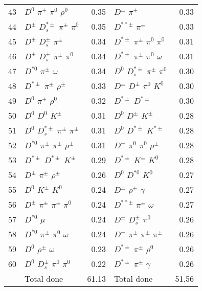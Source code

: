 \documentclass[6pt]{article}
\begin{document}
\begin{tabular}{rlr|lr}
43 & $D^0$ $\pi^{\pm}$ $\pi^0$ $\rho^0$ & 0.35 & $D^{\pm}$ $\pi^{\pm}$ & 0.33 \\
44 & $D^{\pm}$ $D_s^{*\pm}$ $\pi^{\pm}$ $\pi^0$ & 0.35 & $D^{**\pm}$ $\pi^{\pm}$ & 0.33 \\
45 & $D^{\pm}$ $D_s^{\pm}$ $\pi^{\pm}$ & 0.34 & $D^{*\pm}$ $\pi^{\pm}$ $\pi^0$ $\pi^0$ & 0.31 \\
46 & $D^{\pm}$ $D_s^{\pm}$ $\pi^{\pm}$ $\pi^0$ & 0.34 & $D^{*\pm}$ $\pi^{\pm}$ $\pi^0$ $\omega$ & 0.31 \\
47 & $D^{*0}$ $\pi^{\pm}$ $\omega$ & 0.34 & $D^0$ $D_s^{*\pm}$ $\pi^{\pm}$ $\pi^0$ & 0.30 \\
48 & $D^{*\pm}$ $\pi^{\pm}$ $\rho^{\pm}$ & 0.33 & $D^{\pm}$ $D^{\pm}$ $\pi^0$ $K^0$ & 0.30 \\
49 & $D^0$ $\pi^{\pm}$ $\rho^0$ & 0.32 & $D^{*\pm}$ $D^{*\pm}$ & 0.30 \\
50 & $D^0$ $D^0$ $K^{\pm}$ & 0.31 & $D^0$ $D^{\pm}$ $K^{\pm}$ & 0.28 \\
51 & $D^0$ $D_s^{*\pm}$ $\pi^{\pm}$ $\pi^{\pm}$ & 0.31 & $D^0$ $D^{*\pm}$ $K^{*\pm}$ & 0.28 \\
52 & $D^{*0}$ $\pi^{\pm}$ $\pi^{\pm}$ $\rho^{\pm}$ & 0.31 & $D^{\pm}$ $\pi^0$ $\pi^0$ $\rho^{\pm}$ & 0.28 \\
53 & $D^{*\pm}$ $D^{*\pm}$ $K^{\pm}$ & 0.29 & $D^{*\pm}$ $K^{\pm}$ $K^0$ & 0.28 \\
54 & $D^{\pm}$ $\pi^{\pm}$ $\rho^{\pm}$ & 0.26 & $D^0$ $D^{*0}$ $K^0$ & 0.27 \\
55 & $D^0$ $K^{\pm}$ $K^0$ & 0.24 & $D^{\pm}$ $\rho^{\pm}$ $\gamma$ & 0.27 \\
56 & $D^{\pm}$ $\pi^{\pm}$ $\pi^{\pm}$ $\pi^0$ & 0.24 & $D^{**\pm}$ $\pi^{\pm}$ $\omega$ & 0.27 \\
57 & $D^{*0}$ $\mu$ & 0.24 & $D^{\pm}$ $D_s^{\pm}$ $\pi^0$ & 0.26 \\
58 & $D^{*0}$ $\pi^{\pm}$ $\pi^0$ $\omega$ & 0.24 & $D^{\pm}$ $\pi^{\pm}$ $\pi^{\pm}$ $\pi^{\pm}$ & 0.26 \\
59 & $D^0$ $\rho^{\pm}$ $\omega$ & 0.23 & $D^{*\pm}$ $\pi^{\pm}$ $\rho^0$ & 0.26 \\
60 & $D^0$ $D_s^{\pm}$ $\pi^0$ $\pi^0$ & 0.22 & $D^{*\pm}$ $\pi^{\pm}$ $\gamma$ & 0.26 \\
\hline & Total done & 61.13 & Total done & 51.56\\
\end{tabular}
\end{document}
